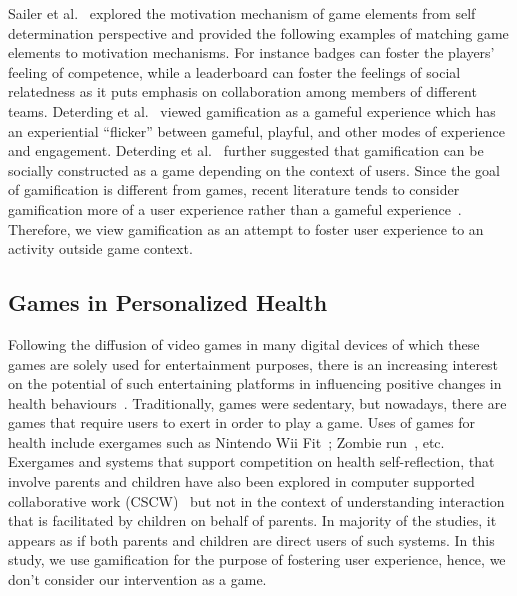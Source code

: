 \documentclass{sig-alternate}
\begin{document}
Sailer et al.~\cite{sailer2013:psychological} explored the motivation mechanism of game elements from self determination perspective and provided the following examples of matching game elements to motivation mechanisms. For instance badges can foster the players' feeling of competence, while a leaderboard can foster the feelings of social relatedness as it puts emphasis on collaboration among members of different teams. Deterding et al.~\cite{deterding2011game} viewed gamification as a gameful experience which has an experiential ``flicker'' between gameful, playful, and other modes of experience and engagement. Deterding et al.~\cite{deterding2011game} further suggested that gamification can be socially constructed as a game depending on the context of users. Since the goal of gamification is different from games, recent literature  tends to consider gamification more of a user experience rather than a gameful experience~\cite{seaborn2015:gamification}. Therefore, we view gamification as an attempt to foster user experience to an activity outside game context.

\subsection{Games in Personalized Health}  
Following the diffusion of video games in many digital devices of which these games are solely used for entertainment purposes, there is an increasing interest on the potential of such entertaining platforms in influencing positive changes in health behaviours~\cite{king2013gamification}. Traditionally, games were sedentary, but nowadays, there are games that require users to exert in order to play a game. Uses of games for health include exergames such as Nintendo Wii Fit~\cite{gobel2010serious}; Zombie run~\cite{witkowski2013running}, etc. Exergames and systems that support competition on health self-reflection, that involve  parents and children have also been explored in computer supported collaborative work (CSCW)~\cite{grimes2009toward,saksono2015spaceship} but not in the context of understanding interaction that is facilitated by children on behalf of parents. In majority of the studies, it appears as if both parents and children are direct users of such systems. In this study, we use gamification for the purpose of fostering user experience, hence, we don't consider our intervention as a game.
\end{document}

